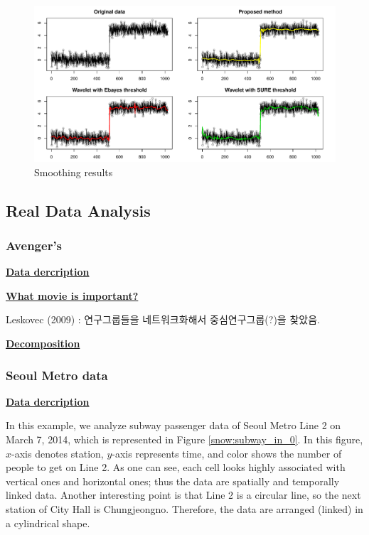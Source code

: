 \documentclass[preprint, review, 12pt]{article}
\theoremstyle{definition}
\theoremstyle{remark}
\begin{document}
\begin{figure}
	\centering
	\includegraphics[width=1\textwidth]{Fig/snow_ex2_fig2.pdf}
	\caption{Smoothing results} 
	\label{snow:ex2_2}
\end{figure}
\fi 

\subsection{Real Data Analysis}
\subsubsection{Avenger's}
\noindent\textbf{\underline{Data dercription}}

\noindent\textbf{\underline{What movie is important?}}

Leskovec (2009) : 연구그룹들을 네트워크화해서 중심연구그룹(?)을 찾았음. 

\noindent\textbf{\underline{Decomposition}}


\subsubsection{Seoul Metro data}
\noindent\textbf{\underline{Data dercription}}

In this example, we analyze subway passenger data of Seoul Metro Line 2 on March 7, 2014, which is represented in Figure \ref{snow:subway_in_0}. In this figure, $x$-axis denotes station, $y$-axis represents time, and color shows the number of people to get on Line 2. As one can see, each cell looks highly associated with vertical ones and horizontal ones; thus the data are spatially and temporally linked data. Another interesting point is that Line 2 is a circular line, so the next station of City Hall is Chungjeongno. Therefore, the data are arranged (linked) in a cylindrical shape.
\end{document}
